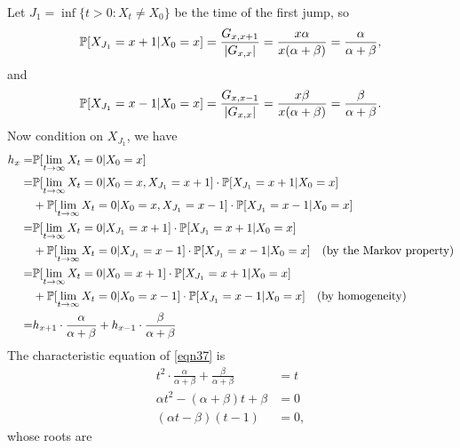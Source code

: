 \begin{enumerate}
\begin{itemize}
        Let $J_1 = \inf\{t > 0: X_t \neq X_0 \}$ be the time of the first jump, so 
        \begin{equation*}
            \mathbb{P}[X_{J_1} = x + 1 | X_0 = x] = \frac{G_{x,x+1}}{|G_{x,x}|} = \frac{x \alpha}{x (\alpha + \beta)} = \frac{\alpha}{\alpha + \beta},
        \end{equation*}
        and 
        \begin{equation*}
            \mathbb{P}[X_{J_1} = x - 1 | X_0 = x] = \frac{G_{x,x-1}}{|G_{x,x}|} = \frac{x \beta}{x (\alpha + \beta)} = \frac{\beta}{\alpha + \beta}.
        \end{equation*}
        Now condition on $X_{J_1}$, we have 
        \begin{align}\label{eqn37}
            h_x = & \mathbb{P} [\lim_{t\to\infty} X_t = 0 | X_0 = x] \notag \\ 
            = & \mathbb{P} [\lim_{t\to\infty} X_t = 0 | X_0 = x, X_{J_1} = x+1] \cdot \mathbb{P}[X_{J_1} = x + 1 | X_0 = x] \notag \\ 
            & + \mathbb{P} [\lim_{t\to\infty} X_t = 0 | X_0 = x, X_{J_1} = x-1] \cdot \mathbb{P}[X_{J_1} = x - 1 | X_0 = x] \notag \\ 
            = & \mathbb{P} [\lim_{t\to\infty} X_t = 0 | X_{J_1} = x+1] \cdot \mathbb{P}[X_{J_1} = x + 1 | X_0 = x] \notag \\ 
            & + \mathbb{P} [\lim_{t\to\infty} X_t = 0 | X_{J_1} = x-1] \cdot \mathbb{P}[X_{J_1} = x - 1 | X_0 = x] \quad \text{(by the Markov property)} \notag \\ 
            = & \mathbb{P} [\lim_{t\to\infty} X_t = 0 | X_{0} = x+1] \cdot \mathbb{P}[X_{J_1} = x + 1 | X_0 = x] \notag \\ 
            & + \mathbb{P} [\lim_{t\to\infty} X_t = 0 | X_{0} = x-1] \cdot \mathbb{P}[X_{J_1} = x - 1 | X_0 = x] \quad \text{(by homogeneity)} \notag \\ 
            = & h_{x+1} \cdot \frac{\alpha}{\alpha + \beta}  +  h_{x-1} \cdot \frac{\beta}{\alpha + \beta}
        \end{align}
        The characteristic equation of \eqref{eqn37} is 
        \begin{align*}
            t^2 \cdot \frac{\alpha}{\alpha + \beta} + \frac{\beta}{\alpha + \beta} & = t \\ 
            \alpha t^2 - (\alpha + \beta) t + \beta & = 0 \\ 
            (\alpha t - \beta) (t - 1) & = 0,
        \end{align*}
        whose roots are 
        \begin{equation*}

\end{equation*}
\end{itemize}
\end{enumerate}
